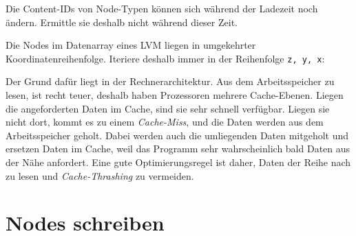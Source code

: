 Die Content-IDs von Node-Typen können sich während der Ladezeit noch
ändern. Ermittle sie deshalb nicht während dieser Zeit.

Die Nodes im Datenarray eines LVM liegen in umgekehrter
Koordinatenreihenfolge. Iteriere deshalb immer in der Reihenfolge
\texttt{z, y, x}:

\begin{Shaded}
\begin{Highlighting}[]
  \OperatorTok{=} \OperatorTok{,}  
      \OperatorTok{=} \OperatorTok{,}  
          \OperatorTok{=} \OperatorTok{,}  
              \OperatorTok{=} \OperatorTok{:}\OperatorTok{(}\OperatorTok{,} \OperatorTok{,} \OperatorTok{)}
             \OperatorTok{[}\OperatorTok{]} \OperatorTok{==}  
                \OperatorTok{(}\OperatorTok{)}
\end{Highlighting}
\end{Shaded}

Der Grund dafür liegt in der Rechnerarchitektur. Aus dem Arbeitsspeicher
zu lesen, ist recht teuer, deshalb haben Prozessoren mehrere
Cache-Ebenen. Liegen die angeforderten Daten im Cache, sind sie sehr
schnell verfügbar. Liegen sie nicht dort, kommt es zu einem
\emph{Cache-Miss}, und die Daten werden aus dem Arbeitsspeicher geholt.
Dabei werden auch die umliegenden Daten mitgeholt und ersetzen Daten im
Cache, weil das Programm sehr wahrscheinlich bald Daten aus der Nähe
anfordert. Eine gute Optimierungsregel ist daher, Daten der Reihe nach
zu lesen und \emph{Cache-Thrashing} zu vermeiden.

\section{Nodes schreiben}\label{nodes-schreiben}

